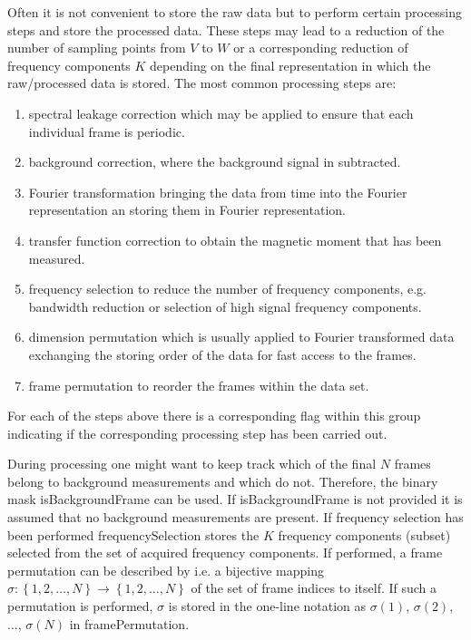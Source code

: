 \documentclass[landscape,a4paper]{article} %
\newcommand{\inlvar}[1]{{\ttfamily#1}}
\begin{document}
\begin{multicols}{2}
Often it is not convenient to store the raw data but to perform certain processing steps and store the processed data. These steps may lead to a reduction of the number of sampling points from $V$ to $W$ or a corresponding reduction of frequency components $K$ depending on the final representation in which the raw/processed data is stored. The most common processing steps are:
\begin{enumerate}
	\item spectral leakage correction which may be applied to ensure that each individual frame is periodic.
	\item background correction, where the background signal in subtracted.
	\item Fourier transformation bringing the data from time into the Fourier representation an storing them in Fourier representation.
	\item transfer function correction to obtain the magnetic moment that has been measured.
	\item frequency selection to reduce the number of frequency components, e.g. bandwidth reduction or selection of high signal frequency components.
	\item dimension permutation which is usually applied to Fourier transformed data exchanging the storing order of the data for fast access to the frames.
	\item frame permutation to reorder the frames within the data set.
\end{enumerate}
For each of the steps above there is a corresponding flag within this group indicating if the corresponding processing step has been carried out. 

During processing one might want to keep track which of the final $N$ frames belong to background measurements and which do not. Therefore, the binary mask \inlvar{isBackgroundFrame} can be used. If \inlvar{isBackgroundFrame} is not provided it is assumed that no background measurements are present. If frequency selection has been performed \inlvar{frequencySelection} stores the $K$ frequency components (subset) selected from the set of acquired frequency components. If performed, a frame permutation can be described by i.e. a bijective mapping $\sigma : \left\{ 1,2,\dots,N \right\} \rightarrow \left\{ 1,2,\dots,N \right\}$ of the set of frame indices to itself. If such a permutation is performed, $\sigma$ is stored in the one-line notation as $\sigma(1)$, $\sigma(2)$, $\dots$, $\sigma(N)$ in \inlvar{framePermutation}.

\end{multicols}
\end{document}
